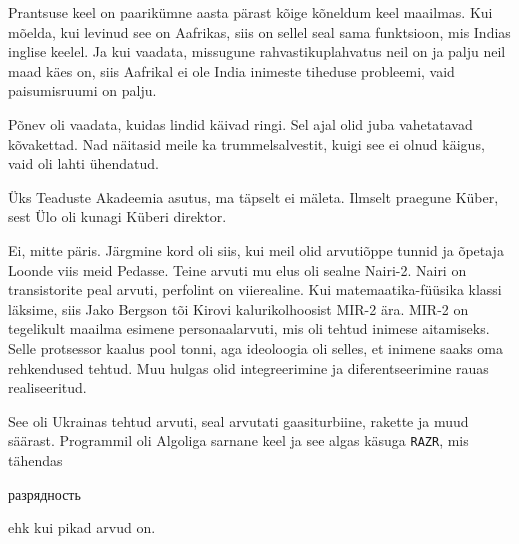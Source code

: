 
Prantsuse keel on paarikümne aasta pärast
kõige kõneldum keel maailmas. Kui mõelda, kui levinud see on Aafrikas, siis on sellel seal sama funktsioon, mis Indias inglise keelel. Ja 
kui 
vaadata, missugune rahvastikuplahvatus neil on ja palju neil maad käes on, siis 
Aafrikal ei ole India inimeste tiheduse probleemi, vaid paisumisruumi on
palju.


Põnev oli vaadata, kuidas lindid käivad ringi. Sel ajal olid juba 
vahetatavad kõvakettad. Nad näitasid meile ka trummelsalvestit, kuigi see 
ei olnud käigus, vaid oli lahti ühendatud.


Üks Teaduste Akadeemia asutus, ma täpselt ei mäleta. Ilmselt 
praegune Küber, sest Ülo oli kunagi Küberi 
direktor.


Ei, mitte päris. Järgmine kord oli siis, kui meil olid arvutiõppe tunnid 
ja õpetaja Loonde viis meid Pedasse. 
Teine arvuti mu elus oli sealne Nairi-2. Nairi on 
transistorite peal arvuti, perfolint on viierealine. Kui 
matemaatika-füüsika klassi läksime, siis Jako Bergson tõi 
Kirovi kalurikolhoosist MIR-2 
ära. MIR-2 on tegelikult maailma esimene personaalarvuti, mis oli tehtud inimese aitamiseks. Selle protsessor kaalus pool 
tonni, aga ideoloogia oli selles, et inimene saaks 
oma rehkendused tehtud. Muu hulgas olid integreerimine ja diferentseerimine 
rauas realiseeritud.


See oli Ukrainas tehtud arvuti, seal arvutati gaasiturbiine, 
rakette ja muud säärast. Programmil oli 
Algoliga sarnane keel ja see algas käsuga \verb|RAZR|, mis tähendas 
\begin{russian}разрядность\end{russian} ehk kui pikad arvud on. 


